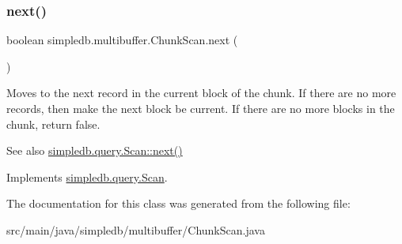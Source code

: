 \mbox{\label{classsimpledb_1_1multibuffer_1_1ChunkScan_a67b28d9b880f45fe94257b483cc3093a}} 
\subsubsection{\texorpdfstring{next()}{next()}}
{\footnotesize\ttfamily boolean simpledb.\+multibuffer.\+Chunk\+Scan.\+next (\begin{DoxyParamCaption}{ }\end{DoxyParamCaption})\hspace{0.3cm}{\ttfamily [inline]}}

Moves to the next record in the current block of the chunk. If there are no more records, then make the next block be current. If there are no more blocks in the chunk, return false. \begin{DoxySeeAlso}{See also}
\hyperlink{interfacesimpledb_1_1query_1_1Scan_a5fc77b7c76d91f89f6c09ac4f15ef351}{simpledb.\+query.\+Scan\+::next()} 
\end{DoxySeeAlso}


Implements \hyperlink{interfacesimpledb_1_1query_1_1Scan_a5fc77b7c76d91f89f6c09ac4f15ef351}{simpledb.\+query.\+Scan}.



The documentation for this class was generated from the following file\+:\begin{DoxyCompactItemize}
\item 
src/main/java/simpledb/multibuffer/Chunk\+Scan.\+java\end{DoxyCompactItemize}
